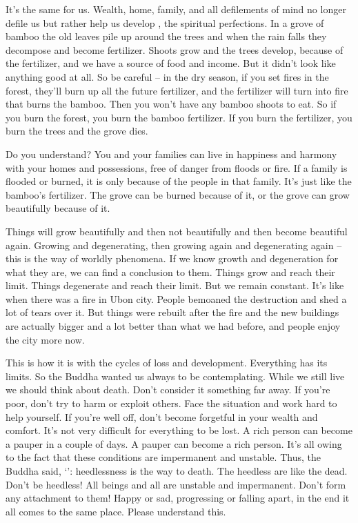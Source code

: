 It's the same for us. Wealth, home, family, and all defilements of mind no longer defile us but rather help us develop , the spiritual perfections. In a grove of bamboo the old leaves pile up around the trees and when the rain falls they decompose and become fertilizer. Shoots grow and the trees develop, because of the fertilizer, and we have a source of food and income. But it didn't look like anything good at all. So be careful -- in the dry season, if you set fires in the forest, they'll burn up all the future fertilizer, and the fertilizer will turn into fire that burns the bamboo. Then you won't have any bamboo shoots to eat. So if you burn the forest, you burn the bamboo fertilizer. If you burn the fertilizer, you burn the trees and the grove dies.

Do you understand? You and your families can live in happiness and harmony with your homes and possessions, free of danger from floods or fire. If a family is flooded or burned, it is only because of the people in that family. It's just like the bamboo's fertilizer. The grove can be burned because of it, or the grove can grow beautifully because of it.

Things will grow beautifully and then not beautifully and then become beautiful again. Growing and degenerating, then growing again and degenerating again -- this is the way of worldly phenomena. If we know growth and degeneration for what they are, we can find a conclusion to them. Things grow and reach their limit. Things degenerate and reach their limit. But we remain constant. It's like when there was a fire in Ubon city. People bemoaned the destruction and shed a lot of tears over it. But things were rebuilt after the fire and the new buildings are actually bigger and a lot better than what we had before, and people enjoy the city more now.

This is how it is with the cycles of loss and development. Everything has its limits. So the Buddha wanted us always to be  contemplating. While we still live we should think about death. Don't consider it something far away. If you're poor, don't try to harm or exploit others. Face the situation and work hard to help yourself. If you're well off, don't become forgetful in your wealth and comfort. It's not very difficult for everything to be lost. A rich person can become a pauper in a couple of days. A pauper can become a rich person. It's all owing to the fact that these conditions are impermanent and unstable. Thus, the Buddha said, `': heedlessness is the way to death. The heedless are like the dead. Don't be heedless! All beings and all  are unstable and impermanent. Don't form any attachment to them! Happy or sad, progressing or falling apart, in the end it all comes to the same place. Please understand this.

